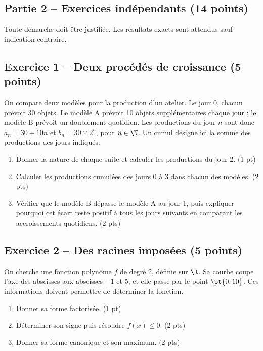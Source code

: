 \mxnewpage\subsection*{Partie 2 -- Exercices indépendants (14 points)}
Toute démarche doit être justifiée. Les résultats exacts sont attendus sauf indication contraire.
\subsection*{Exercice 1 -- Deux procédés de croissance (5 points)}
On compare deux modèles pour la production d’un atelier. Le jour 0, chacun prévoit 30 objets. Le modèle A prévoit 10 objets supplémentaires chaque jour ; le modèle B prévoit un doublement quotidien. Les productions du jour $n$ sont donc $a_n=30+10n$ et $b_n=30\times2^n$, pour $n\in\N$. Un cumul désigne ici la somme des productions des jours indiqués.
\begin{enumerate}
\item Donner la nature de chaque suite et calculer les productions du jour 2. \hfill(1 pt)
\item Calculer les productions cumulées des jours 0 à 3 dans chacun des modèles. \hfill(2 pts)
\item Vérifier que le modèle B dépasse le modèle A au jour 1, puis expliquer pourquoi cet écart reste positif à tous les jours suivants en comparant les accroissements quotidiens. \hfill(2 pts)
\end{enumerate}
\subsection*{Exercice 2 -- Des racines imposées (5 points)}
On cherche une fonction polynôme $f$ de degré 2, définie sur $\R$. Sa courbe coupe l’axe des abscisses aux abscisses $-1$ et 5, et elle passe par le point $\pt{0;10}$. Ces informations doivent permettre de déterminer la fonction.
\begin{enumerate}
\item Donner sa forme factorisée. \hfill(1 pt)
\item Déterminer son signe puis résoudre $f(x)\leq0$. \hfill(2 pts)
\item Donner sa forme canonique et son maximum. \hfill(2 pts)
\end{enumerate}
